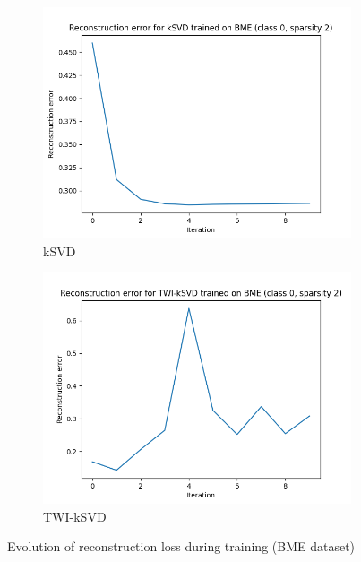 \documentclass[11pt]{article}
\begin{document}
\begin{figure}[!ht]
    \centering
    \begin{subfigure}[b]{0.49\textwidth}
      \includegraphics[width=\textwidth]{../../figures/loss_kSVD_spars_2_class_0_BME.png}
      \caption{kSVD}
    \end{subfigure}
    \begin{subfigure}[b]{0.49\textwidth}
        \includegraphics[width=\textwidth]{../../figures/loss_TWI_kSVD_spars_2_class_0_BME.png}
        \caption{TWI-kSVD}
      \end{subfigure}
    \caption{Evolution of reconstruction loss during training (BME dataset)}\label{fig:loss_BME}
\end{figure}
\end{document}

